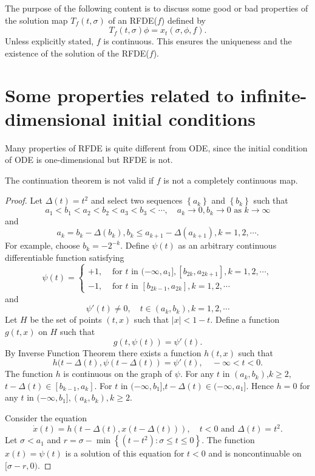 The purpose of the following content is to discuss some good or bad properties of the solution map $T_f(t,\sigma)$ of an RFDE($f$) defined by
\begin{equation}
  T_f(t,\sigma)\phi=x_t(\sigma,\phi,f).
\end{equation}
Unless explicitly stated, $f$ is continuous. This ensures the uniqueness and the existence of the solution of the RFDE($f$).

\section{Some properties related to infinite-dimensional initial conditions}
Many properties of RFDE is quite different from ODE, since the initial condition of ODE is one-dimensional but RFDE is not. 
\begin{proposition}
  The continuation theorem is not valid if $f$ is not a completely continuous map.
\end{proposition}
\begin{proof}
  Let $\Delta(t)=t^2$ and select two sequences $\left\{a_k\right\} $ and $\left\{b_k\right\} $ such that 
  \[
  a_1<b_1<a_2<b_2<a_3<b_3<\cdots,\quad a_k\to 0,b_k\to 0 \text{ as } k\to \infty
  \] 
  and
  \[
    a_k=b_k-\Delta(b_k),b_k\le a_{k+1}-\Delta(a_{k+1}),k=1,2,\cdots.
  \] 
  For example, choose $b_k=-2^{-k}$. Define $\psi(t)$ as an arbitrary continuous differentiable function satisfying 
  \begin{equation*}
    \psi(t)=\left\{\begin{aligned}
	+1, & \text{ for }t \text{ in } (-\infty,a_1],[b_{2k},a_{2k+1}],k=1,2,\cdots,\\
	-1, & \text{ for }t \text{ in } [b_{2k-1},a_{2k}],k=1,2,\cdots
    \end{aligned}
    \right.
  \end{equation*}
  and 
  \[
    \psi'(t)\neq 0,\quad t\in (a_k,b_k),k=1,2,\cdots
  \] 
  Let $H$ be the set of points $(t,x)$ such that $|x|<1-t$. Define a function  $g(t,x)$ on $H$ such that 
  \[
    g(t,\psi(t))=\psi'(t).
  \] 
  By Inverse Function Theorem there exists a function $h(t,x)$ such that
  \[
    h(t-\Delta(t),\psi(t-\Delta(t))=\psi'(t),\quad -\infty<t<0.
  \] 
  The function $h$ is continuous on the graph of $\psi $. For any $t$ in $(a_k,b_k)$,$k\ge 2$, $t-\Delta (t)\in [b_{k-1},a_k]$. For $t$ in $(-\infty,b_1]$,$t-\Delta(t)\in (-\infty,a_1]$. Hence $h=0$ for any $t$ in $(-\infty,b_1],(a_k,b_k),k\ge 2$.

  Consider the equation 
  \begin{equation}
    \dot{x}(t)=h(t-\Delta(t),x(t-\Delta(t))),\quad t<0 \text{ and }\Delta(t)=t^2.
  \end{equation}
  Let $\sigma<a_1$ and $r=\sigma-\min \left\{(t-t^2):\sigma\le t\le 0\right\} $.  The function $x(t)=\psi(t)$ is a solution of this equation for $t<0$ and is noncontinuable on $[\sigma-r,0)$.
\end{proof}
